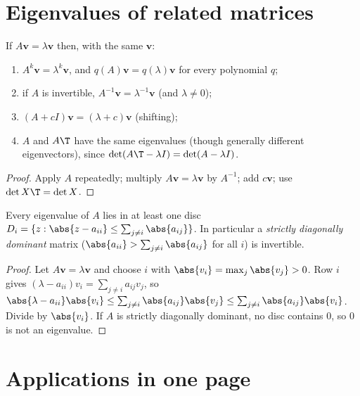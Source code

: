 \section{Eigenvalues of related matrices}

\begin{proposition}\label{prop:eigfunc}
If $A\mathbf{v}=\lambda\mathbf{v}$ then, with the same $\mathbf{v}$:
\begin{enumerate}[label=(\roman*)]
  \item $A^k\mathbf{v}=\lambda^k\mathbf{v}$, and $q(A)\mathbf{v}=q(\lambda)\mathbf{v}$ for every polynomial $q$;
  \item if $A$ is invertible, $A^{-1}\mathbf{v}=\lambda^{-1}\mathbf{v}$ (and $\lambda\ne0$);
  \item $(A+cI)\mathbf{v}=(\lambda+c)\mathbf{v}$ (shifting);
  \item $A$ and $A\T$ have the same eigenvalues (though generally different eigenvectors), since $\det(A\T-\lambda I)=\det(A-\lambda I)$.
\end{enumerate}
\end{proposition}

\begin{proof}
Apply $A$ repeatedly; multiply $A\mathbf{v}=\lambda\mathbf{v}$ by $A^{-1}$; add $c\mathbf{v}$; use $\det X\T=\det X$.
\end{proof}

\begin{theorem}\label{thm:gershgorin}
Every eigenvalue of $A$ lies in at least one disc $D_i=\{z:\abs{z-a_{ii}}\le\sum_{j\ne i}\abs{a_{ij}}\}$. In particular a \emph{strictly diagonally dominant} matrix ($\abs{a_{ii}}>\sum_{j\ne i}\abs{a_{ij}}$ for all $i$) is invertible.
\end{theorem}

\begin{proof}
Let $A\mathbf{v}=\lambda\mathbf{v}$ and choose $i$ with $\abs{v_i}=\max_j\abs{v_j}>0$. Row $i$ gives $(\lambda-a_{ii})v_i=\sum_{j\ne i}a_{ij}v_j$, so $\abs{\lambda-a_{ii}}\abs{v_i}\le\sum_{j\ne i}\abs{a_{ij}}\abs{v_j}\le\sum_{j\ne i}\abs{a_{ij}}\abs{v_i}$. Divide by $\abs{v_i}$. If $A$ is strictly diagonally dominant, no disc contains $0$, so $0$ is not an eigenvalue.
\end{proof}

\section{Applications in one page}

